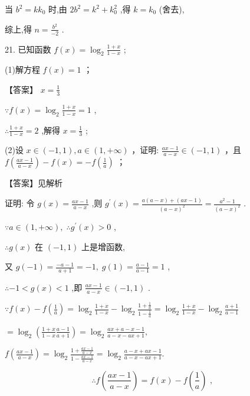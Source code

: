 \documentclass[10pt]{article}
\begin{document}
当 \({b}^{2} = k{k}_{0}\) 时,由 \(2{b}^{2} = {k}^{2} + {k}_{0}^{2}\) ,得 \(k = {k}_{0}\) (舍去),

综上,得 \(n = \frac{{b}^{2}}{-2}\) .

21. 已知函数 \(f\left( x\right)  = {\log }_{2}\frac{1 + x}{1 - x}\) ;

(1)解方程 \(f\left( x\right)  = 1\) ；

【答案】 \(x = \frac{1}{3}\)

\(\because f\left( x\right)  = {\log }_{2}\frac{1 + x}{1 - x} = 1\) ,

\(\therefore \frac{1 + x}{1 - x} = 2\) ,解得 \(x = \frac{1}{3}\) ;

(2)设 \(x \in  \left( {-1,1}\right) ,a \in  \left( {1, + \infty }\right)\) ，证明: \(\frac{{ax} - 1}{a - x} \in  \left( {-1,1}\right)\) ，且 \(f\left( \frac{{ax} - 1}{a - x}\right)  - f\left( x\right)  =  - f\left( \frac{1}{a}\right)\) ；

【答案】见解析

证明: 令 \(g\left( x\right)  = \frac{{ax} - 1}{a - x}\) ,则 \({g}^{\prime }\left( x\right)  = \frac{a\left( {a - x}\right)  + \left( {{ax} - 1}\right) }{{\left( a - x\right) }^{2}} = \frac{{a}^{2} - 1}{{\left( a - x\right) }^{2}}\) .

\(\because a \in  \left( {1, + \infty }\right) ,\;\therefore {g}^{\prime }\left( x\right)  > 0\) ,

\(\therefore g\left( x\right)\) 在 \(\left( {-1,1}\right)\) 上是增函数,

又 \(g\left( {-1}\right)  = \frac{-a - 1}{a + 1} =  - 1,\;g\left( 1\right)  = \frac{a - 1}{a - 1} = 1\) ,

\(\therefore  - 1 < g\left( x\right)  < 1\) ,即 \(\frac{{ax} - 1}{a - x} \in  \left( {-1,1}\right)\) .

\(\because f\left( x\right)  - f\left( \frac{1}{a}\right)  = {\log }_{2}\frac{1 + x}{1 - x} - {\log }_{2}\frac{1 + \frac{1}{a}}{1 - \frac{1}{a}} = {\log }_{2}\frac{1 + x}{1 - x} - {\log }_{2}\frac{a + 1}{a - 1}\)

\(= {\log }_{2}\left( {\frac{1 + x}{1 - x}\frac{a - 1}{a + 1}}\right)  = {\log }_{2}\frac{{ax} + a - x - 1}{a - x - {ax} + 1},\)

\(f\left( \frac{{ax} - 1}{a - x}\right)  = {\log }_{2}\frac{1 + \frac{{ax} - 1}{a - x}}{1 - \frac{{ax} - 1}{a - x}} = {\log }_{2}\frac{a - x + {ax} - 1}{a - x - {ax} + 1}.\)

\[
\therefore f\left( \frac{{ax} - 1}{a - x}\right)  = f\left( x\right)  - f\left( \frac{1}{a}\right) \text{ , }
\]
\end{document}
